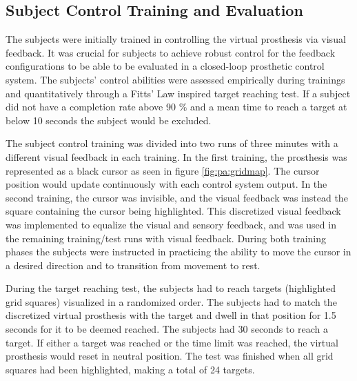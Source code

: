 \subsection{Subject Control Training and Evaluation} \label{sec:pa:subjectcontrol}
The subjects were initially trained in controlling the virtual prosthesis via visual feedback. It was crucial for subjects to achieve robust control for the feedback configurations to be able to be evaluated in a closed-loop prosthetic control system. The subjects' control abilities were assessed empirically during trainings and quantitatively through a Fitts' Law inspired target reaching test. If a subject did not have a completion rate above 90 $\%$ and a mean time to reach a target at below 10 seconds the subject would be excluded. 

The subject control training was divided into two runs of three minutes with a different visual feedback in each training. In the first training, the prosthesis was represented as a black cursor as seen in figure \ref{fig:pa:gridmap}. The cursor position would update continuously with each control system output. In the second training, the cursor was invisible, and the visual feedback was instead the square containing the cursor being highlighted. This discretized visual feedback was implemented to equalize the visual and sensory feedback, and was used in the remaining training/test runs with visual feedback. During both training phases the subjects were instructed in practicing the ability to move the cursor in a desired direction and to transition from movement to rest. 

During the target reaching test, the subjects had to reach targets (highlighted grid squares) visualized in a randomized order. The subjects had to match the discretized virtual prosthesis with the target and dwell in that position for 1.5 seconds for it to be deemed reached. The subjects had 30 seconds to reach a target. If either a target was reached or the time limit was reached, the virtual prosthesis would reset in neutral position. The test was finished when all grid squares had been highlighted, making a total of 24 targets. 